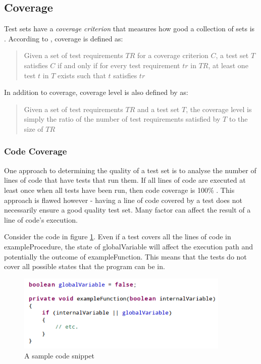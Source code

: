 \subsection{Coverage}

Test sets have a \emph{coverage criterion} that measures how good a collection of sets is \citep{softwareTestingIntro}. According to \citet{softwareTestingIntro}, coverage is defined as:

\begin{quote} Given a set of test requirements $TR$ for a coverage criterion $C$, a test set $T$ satisfies $C$ if and only if for every test requirement $tr$ in $TR$, at least one test $t$ in $T$ exists such that $t$ satisfies $tr$ \end{quote}

In addition to coverage, coverage level is also defined by \citep{softwareTestingIntro} as:

\begin{quote}Given a set of test requirements $TR$ and a test set $T$, the coverage level is simply the ratio of the number of test requirements satisfied by $T$ to the size of $TR$\end{quote}

\subsubsection{Code Coverage}


One approach to determining the quality of a test set is to analyse the number of lines of code that have tests that run them. If all lines of code are executed at least once when all tests have been run, then code coverage is 100\% \citep{something}. This approach is flawed however - having a line of code covered by a test does not necessarily ensure a good quality test set. Many factor can affect the result of a line of code's execution. 

Consider the code in figure \ref{sampleCoverageCode}. Even if a test covers all the lines of code in exampleProcedure, the state of globalVariable will affect the execution path and potentially the outcome of exampleFunction. This means that the tests do not cover all possible states that the program can be in.

\begin{figure}
	\begin{center}
		\includegraphics[width=4in]{figures/code_coverage.png}
	\end{center}
\caption{A sample code snippet}
\label{sampleCoverageCode}
\end{figure}

